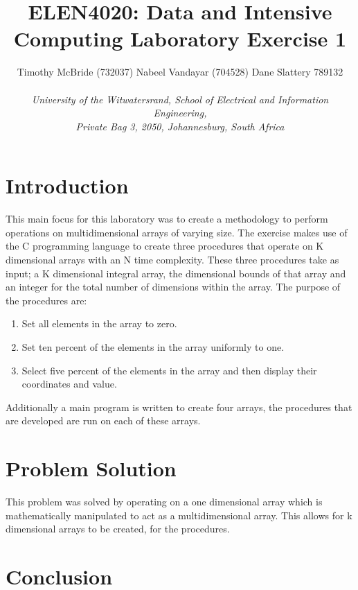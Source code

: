\documentclass{TechReport}
\begin{document}
%
\title{ELEN4020: Data and Intensive Computing Laboratory Exercise 1}
%
\author{Timothy McBride (732037) \hspace{1.5em} Nabeel Vandayar (704528) \hspace{1.5em} Dane Slattery 789132\\  
\\	
\emph{University of the Witwatersrand, School of Electrical and Information Engineering,\\ Private Bag 3, 2050,
	Johannesburg, South Africa
                                                              }}


%
\maketitle
%
\section{Introduction}
\label{sec:Introduction}
This main focus for this laboratory was to create a methodology to perform operations on multidimensional arrays of varying size. The exercise makes use of the C programming language to create three procedures that operate on K dimensional arrays with an N time complexity. These three procedures take as input; a K dimensional integral array, the dimensional bounds of that array and an integer for the total number of dimensions within the array. The purpose of the procedures are:
\begin{enumerate}
\item Set all elements in the array to zero.
\item Set ten percent of the elements in the array uniformly to one.
\item Select five percent of the elements in the array and then display their coordinates and value.
\end{enumerate} 
Additionally a main program is written to create four arrays, the procedures that are developed are run on each of these arrays.
 
\section{Problem Solution}
This problem was solved by operating on a one dimensional array which is mathematically manipulated to act as a multidimensional array. This allows for k dimensional arrays to be created, for the procedures. 

\section{Conclusion}
\label{sec:Conclusion}


\begin{thebibliography}{99}	



	 
\end{thebibliography}
\end{document}
